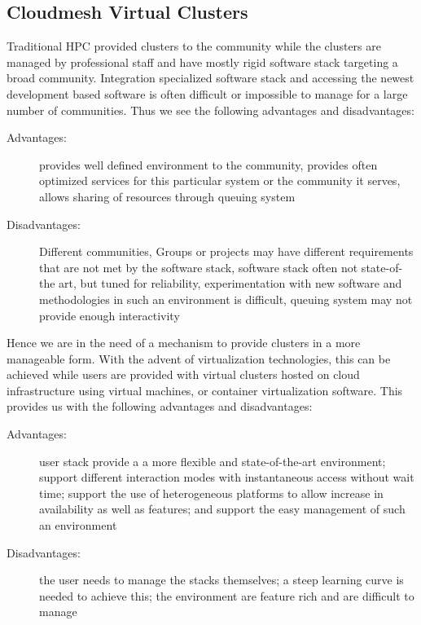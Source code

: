 \subsection{Cloudmesh Virtual Clusters} \label{S:vc}

Traditional HPC provided clusters to the community while  the clusters
are managed by professional staff and have mostly rigid software
stack targeting a broad community. Integration specialized software
stack and accessing the newest development based software is often
difficult or impossible to manage for a large number of
communities. Thus we see the following advantages and disadvantages:

\begin{description}

\item[Advantages:] provides well defined environment to the community,
  provides often optimized services for this particular system or the
  community it serves, allows sharing of resources through queuing
  system

\item[Disadvantages:] Different communities, Groups or projects may
  have different requirements that are not met by the software stack,
  software stack often not state-of-the art, but tuned for
  reliability, experimentation with new software and methodologies in
  such an environment is difficult, queuing system may not provide
  enough interactivity

\end{description}

 Hence we are in the need of a mechanism to provide
clusters in a more manageable form. With the advent of virtualization
technologies, this can be achieved while users are provided with
virtual clusters hosted on cloud infrastructure using virtual machines,
or container virtualization software. This provides us with the
following advantages and disadvantages:

\begin{description}

\item[Advantages:] user stack provide a a more flexible and
  state-of-the-art environment; support different interaction modes
  with instantaneous access without wait time; support the use of
  heterogeneous platforms to allow increase in availability as well as
  features; and support the easy management of such an environment

\item[Disadvantages:] the user needs to manage the stacks themselves; a
  steep learning curve is needed to achieve this; the environment are
  feature rich and are difficult to manage

\end{description}

